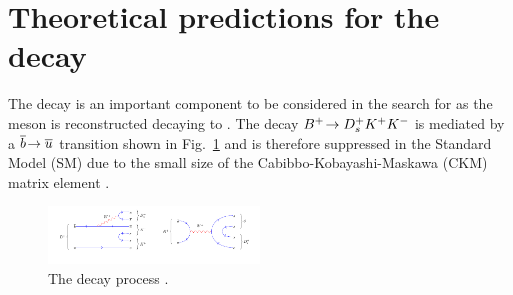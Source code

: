 \section{Theoretical predictions for the \decay{\Bp}{\Dsp\Kp\Km} decay}

The decay \decay{\Bp}{\Dsp\Kp\Km} is an important component to be considered in the search for \decay{\Bp}{\Dsp\phiz} as the \phiz meson is reconstructed decaying to \Kp\Km.
The decay ${{{B}^+}}\!\rightarrow {\ensuremath{{D}^+_{s}}}{\ensuremath{{K}^+}}{\ensuremath{{K}^-}}$ is mediated by a ${\overline {{b}}}\!\rightarrow {\ensuremath{\overline {{u}}}}$ transition shown in Fig.~\ref{fig:Theory_DsKKDiagram} and is therefore suppressed in the Standard Model (SM) due to the small size of the Cabibbo-Kobayashi-Maskawa (CKM) matrix element \Vub.
\begin{figure}[!h]
    \centering
    \includegraphics[width=0.5\textwidth]{figs/Theory/B2DsKK.pdf}
    \caption{The decay process \decay{\Bp}{\Dsp\Kp\Km}.}
    \label{fig:Theory_DsKKDiagram}   
\end{figure}


